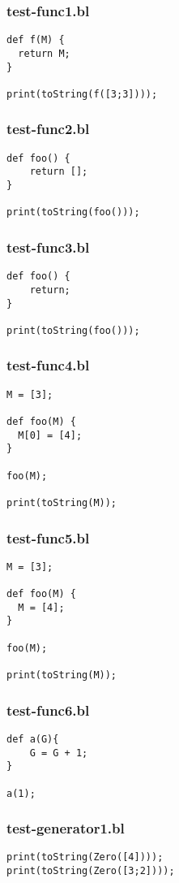 \subsubsection{test-func1.bl}
\begin{lstlisting}
def f(M) {
  return M;
}

print(toString(f([3;3])));
\end{lstlisting}
\subsubsection{test-func2.bl}
\begin{lstlisting}
def foo() {
    return [];
}

print(toString(foo()));\end{lstlisting}
\subsubsection{test-func3.bl}
\begin{lstlisting}
def foo() {
    return;
}

print(toString(foo()));
\end{lstlisting}
\subsubsection{test-func4.bl}
\begin{lstlisting}
M = [3];

def foo(M) {
  M[0] = [4];
}

foo(M);

print(toString(M));
\end{lstlisting}
\subsubsection{test-func5.bl}
\begin{lstlisting}
M = [3];

def foo(M) {
  M = [4];
}

foo(M);

print(toString(M));
\end{lstlisting}
\subsubsection{test-func6.bl}
\begin{lstlisting}
def a(G){
    G = G + 1;
}

a(1);
\end{lstlisting}
\subsubsection{test-generator1.bl}
\begin{lstlisting}
print(toString(Zero([4])));
print(toString(Zero([3;2])));\end{lstlisting}
